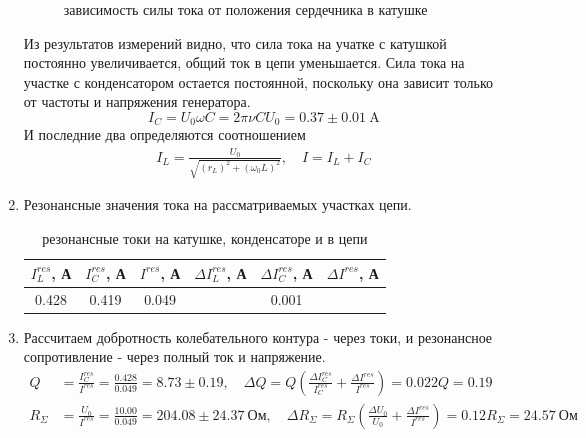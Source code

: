 \documentclass[a4paper, 12pt]{article}
\begin{document}
\begin{enumerate}
\begin{figure}[htbp]
        \label{зависимость сил тока для разных расстояний}
        \caption{зависимость силы тока от положения сердечника в катушке}
    \end{figure}\newline
    Из результатов измерений видно, что сила тока на учатке с катушкой постоянно увеличивается, общий ток в цепи уменьшается. Сила тока 
    на участке с конденсатором остается постоянной, поскольку она зависит только от частоты и напряжения генератора.
    \begin{equation}
        I_{C} = U_{0} \omega C = 2\pi \nu C U_{0} = 0.37\pm 0.01\ \text{A}
        \label{ток на участке с конденсатором}
    \end{equation}
    И последние два определяются соотношением
    \begin{align}
        I_{L} = \frac{U_{0}}{\sqrt{(r_{L})^{2} + (\omega_{0}L)^{2}}}, \quad I = I_{L} + I_{C}
    \end{align}
    \item Резонансные значения тока на рассматриваемых участках цепи.
    \begin{table}[H]
        \centering
        \begin{tabular}{|c|c|c|c|c|c|}
            \hline
            $I^{res}_{L}$, А & $I^{res}_{C}$, А & $I^{res}$, А & $\Delta I^{res}_{L}$, А & $\Delta I^{res}_{C}$, А & $\Delta I^{res}$, А\\
            \hline
            0.428 & 0.419 & 0.049 & \multicolumn{3}{|c|}{0.001}\\
            \hline
        \end{tabular}
        \caption{резонансные токи на катушке, конденсаторе и в цепи}
        \label{резонансные токи на катушке, конденсаторе и в цепи}
    \end{table}
    \item Рассчитаем добротность колебательного контура - через токи, и резонансное сопротивление - через полный ток и напряжение.
    \begin{align}
        Q &= \frac{I^{res}_{C}}{I^{res}} = \frac{0.428}{0.049} = 8.73 \pm 0.19, \quad \Delta Q = Q\left(\frac{\Delta I^{res}_{C}}{I^{res}_{C}} + \frac{\Delta I^{res}}{I^{res}}\right) = 0.022Q = 0.19\\
        R_{\Sigma} &= \frac{U_{0}}{I^{res}} = \frac{10.00}{0.049} = 204.08 \pm 24.37\ \text{Ом}, \quad \Delta R_{\Sigma} = R_{\Sigma}\left(\frac{\Delta U_{0}}{U_{0}} + \frac{\Delta I^{res}}{I^{res}}\right) = 0.12R_{\Sigma} = 24.57\ \text{Ом}
    \end{align}

\end{enumerate}
\end{document}
